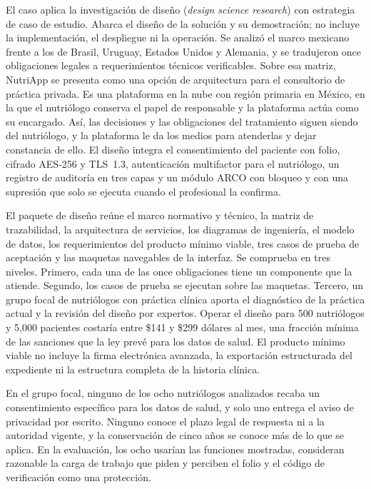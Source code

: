 \documentclass[12pt, a4paper]{article}
\begin{document}
El caso aplica la investigación de diseño (\textit{design science
research}) con estrategia de caso de estudio. Abarca el diseño de la
solución y su demostración; no incluye la implementación, el despliegue
ni la operación. Se analizó el marco mexicano frente a los de Brasil,
Uruguay, Estados Unidos y Alemania, y se tradujeron once obligaciones
legales a requerimientos técnicos verificables. Sobre esa matriz,
NutriApp se presenta como una opción de arquitectura para el consultorio
de práctica privada. Es una plataforma en la nube con región primaria en
México, en la que el nutriólogo conserva el papel de responsable y la
plataforma actúa como su encargado. Así, las decisiones y las
obligaciones del tratamiento siguen siendo del nutriólogo, y la
plataforma le da los medios para atenderlas y dejar constancia de ello.
El diseño integra el consentimiento del paciente con folio, cifrado
AES-256 y TLS~1.3, autenticación multifactor para el nutriólogo, un
registro de auditoría en tres capas y un módulo ARCO con bloqueo y con
una supresión que solo se ejecuta cuando el profesional la confirma.
 
El paquete de diseño reúne el marco normativo y técnico, la matriz de
trazabilidad, la arquitectura de servicios, los diagramas de ingeniería,
el modelo de datos, los requerimientos del producto mínimo viable, tres
casos de prueba de aceptación y las maquetas navegables de la interfaz.
Se comprueba en tres niveles. Primero, cada una de las once obligaciones
tiene un componente que la atiende. Segundo, los casos de prueba se
ejecutan sobre las maquetas. Tercero, un grupo focal de nutriólogos con
práctica clínica aporta el diagnóstico de la práctica actual y la
revisión del diseño por expertos. Operar el diseño para 500 nutriólogos
y 5,000 pacientes costaría entre \$141 y \$299 dólares al mes, una
fracción mínima de las sanciones que la ley prevé para los datos de
salud. El producto mínimo viable no incluye la firma electrónica
avanzada, la exportación estructurada del expediente ni la estructura
completa de la historia clínica.
 
En el grupo focal, ninguno de los ocho nutriólogos analizados recaba un
consentimiento específico para los datos de salud, y solo uno entrega el
aviso de privacidad por escrito. Ninguno conoce el plazo legal de
respuesta ni a la autoridad vigente, y la conservación de cinco años se
conoce más de lo que se aplica. En la evaluación, los ocho usarían las
funciones mostradas, consideran razonable la carga de trabajo que piden
y perciben el folio y el código de verificación como una protección.
 
\end{document}
